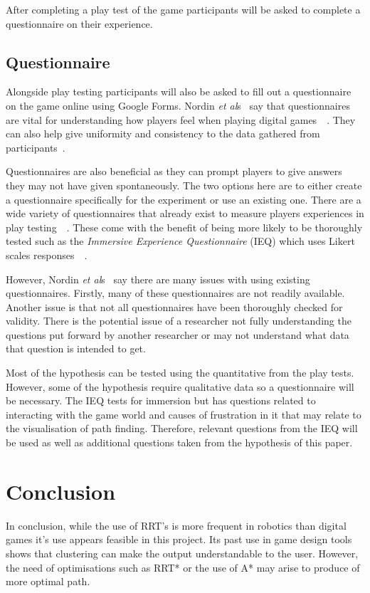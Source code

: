 \documentclass[journal]{IEEEtran}
\begin{document}
After completing a play test of the game participants will be asked to complete a questionnaire on their experience.\\

\subsection{Questionnaire}
Alongside play testing participants will also be asked to fill out a questionnaire on the game online using Google Forms. Nordin \textit{et al}s~\cite{nordin2014} say that questionnaires are vital for understanding how players feel when playing digital games~\cite{nordin2014}~\cite{Denisova2016}. They can also help give uniformity and consistency to the data gathered from participants~\cite{Denisova2016}.

Questionnaires are also beneficial as they can prompt players to give answers they may not have given spontaneously. The two options here are to either create a questionnaire specifically for the experiment or use an existing one. There are a wide variety of questionnaires that already exist to measure players experiences in play testing~\cite{nordin2014}~\cite{Jennett2008}. These come with the benefit of being more likely to be thoroughly tested such as the \textit{Immersive  Experience
Questionnaire} (IEQ) which uses Likert scales responses~\cite{nordin2014}~\cite{Jennett2008}.
 
However, Nordin \textit{et al}s~\cite{nordin2014} say there are many issues with using existing questionnaires. Firstly, many of these questionnaires are not readily available. Another issue is that not all questionnaires have been thoroughly checked for validity. There is the potential issue of a researcher not fully understanding the questions put forward by another researcher or may not understand what data that question is intended to get.

Most of the hypothesis can be tested using the quantitative from the play tests. However, some of the hypothesis require qualitative data so a questionnaire will be necessary.  The IEQ tests for immersion but has questions related to interacting with the game world and causes of frustration in it that may relate to the visualisation of path finding.  Therefore, relevant questions from the IEQ will be used as well as additional questions taken from the hypothesis of this paper.


\section{Conclusion}
In conclusion, while the use of RRT's is more frequent in robotics than digital games it's use appears feasible in this project. Its past use in game design tools shows that clustering can make the output understandable to the user. However,  the need of optimisations  such as RRT* or the use of A* may arise to produce of more optimal path. 
\end{document}
